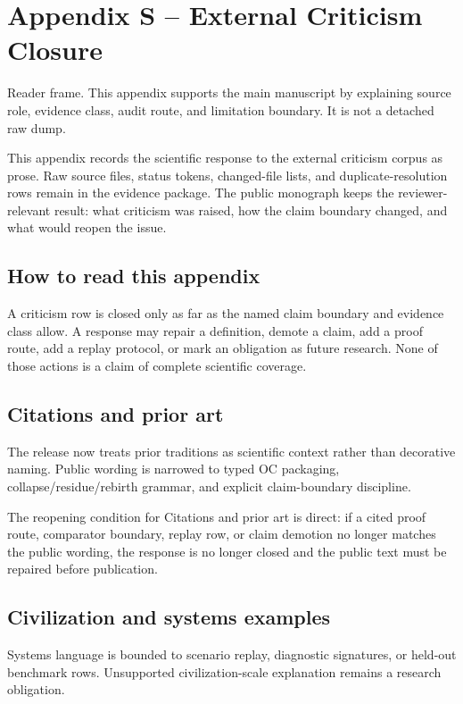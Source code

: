 \section{Appendix S -- External Criticism Closure}
Reader frame. This appendix supports the main manuscript by explaining source role, evidence class, audit route, and limitation boundary. It is not a detached raw dump.


\label{sec:oc13-external-criticism-closure}

This appendix records the scientific response to the external criticism corpus as prose. Raw source files, status tokens, changed-file lists, and duplicate-resolution rows remain in the evidence package. The public monograph keeps the reviewer-relevant result: what criticism was raised, how the claim boundary changed, and what would reopen the issue.


\subsection{How to read this appendix}

A criticism row is closed only as far as the named claim boundary and evidence class allow. A response may repair a definition, demote a claim, add a proof route, add a replay protocol, or mark an obligation as future research. None of those actions is a claim of complete scientific coverage.


\subsection{Citations and prior art}

The release now treats prior traditions as scientific context rather than decorative naming. Public wording is narrowed to typed OC packaging, collapse/residue/rebirth grammar, and explicit claim-boundary discipline.


The reopening condition for Citations and prior art is direct: if a cited proof route, comparator boundary, replay row, or claim demotion no longer matches the public wording, the response is no longer closed and the public text must be repaired before publication.


\subsection{Civilization and systems examples}

Systems language is bounded to scenario replay, diagnostic signatures, or held-out benchmark rows. Unsupported civilization-scale explanation remains a research obligation.


